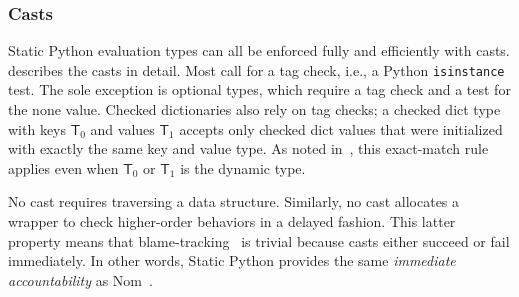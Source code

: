 \documentclass[english,cleveref,crc]{programming}
\newcommand{\SP}{Static Python}
\newcommand{\code}[1]{\texttt{#1}}
\newcommand{\typefont}[1]{\mathsf{#1}}
\newcommand{\spteval}{\typefont{T}}
\begin{document}
\subsubsection{Casts}

\SP{} evaluation types can all be enforced fully and efficiently
with casts.
 describes the casts in detail.
Most call for a tag check, i.e., a Python \code{isinstance} test.
The sole exception is optional types, which require a tag check and a test for the none value.
Checked dictionaries also rely on tag checks;
a checked dict type with keys $\spteval_0$ and values $\spteval_1$ accepts only
checked dict values that were initialized with exactly the same key and value type.
As noted in~, this exact-match rule applies even when $\spteval_0$
or $\spteval_1$ is the dynamic type.

No cast requires traversing a data structure.
Similarly, no cast allocates a wrapper to check higher-order behaviors in a delayed fashion.
This latter property means that blame-tracking~\cite{ff-icfp-2002} is trivial because
casts either succeed or fail immediately.
In other words, \SP{} provides the same \emph{immediate accountability} as
Nom~\cite{mt-oopsla-2017}.

\end{document}
